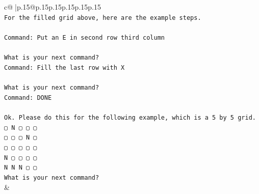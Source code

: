 \documentclass{article}
\begin{document}
{\begin{supertabular}{c@{$\;$}|p{.15\linewidth}@{}p{.15\linewidth}p{.15\linewidth}p{.15\linewidth}p{.15\linewidth}p{.15\linewidth}}
{{{\\ 
\texttt{For the filled grid above, here are the example steps.} \\
\\ 
\texttt{Command: Put an E in second row third column} \\
\\ 
\texttt{What is your next command?} \\
\texttt{Command: Fill the last row with X} \\
\\ 
\texttt{What is your next command?} \\
\texttt{Command: DONE} \\
\\ 
\texttt{Ok. Please do this for the following example, which is a 5 by 5 grid.} \\
\texttt{▢ N ▢ ▢ ▢} \\
\texttt{▢ ▢ ▢ N ▢} \\
\texttt{▢ ▢ ▢ ▢ ▢} \\
\texttt{N ▢ ▢ ▢ ▢} \\
\texttt{N N N ▢ ▢} \\
\texttt{What is your next command?} \\
            }
        }
    }
    & \\ \\


\end{supertabular}}
\end{document}
